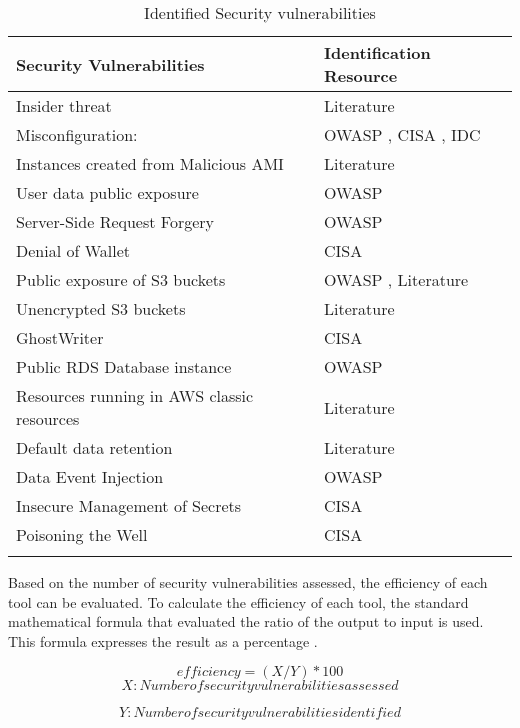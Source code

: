 \begin{longtable}{|p{9cm}|p{4.2cm}|}
    \hline
    \textbf{Security Vulnerabilities} & \textbf{Identification Resource}\\
    \hline
    Insider threat & Literature \cite{93} \\
    \hline
    Misconfiguration: & OWASP \cite{51}, CISA \cite{52}, IDC \cite{53} \\
    \hline
    Instances created from Malicious AMI & Literature \cite{58} \\
    \hline
    User data public exposure & OWASP \cite{51} \\
    \hline
    Server-Side Request Forgery & OWASP \cite{51} \\
    \hline
    Denial of Wallet & CISA \cite{52} \\
    \hline
    Public exposure of S3 buckets & OWASP \cite{51}, Literature
    \cite{94}\\
    \hline
    Unencrypted S3 buckets & Literature \cite{95}\\
    \hline
    GhostWriter & CISA \cite{52} \\
    \hline
    Public RDS Database instance & OWASP \cite{51} \\
    \hline
    Resources running in AWS classic resources &
    Literature \cite{96}\\
    \hline
    Default data retention & Literature \cite{97} \\
    \hline
    Data Event Injection & OWASP \cite{51} \\
    \hline
    Insecure Management of Secrets & CISA \cite{52} \\
    \hline
    Poisoning the Well & CISA \cite{52} \\
    \hline
    \caption{Identified Security vulnerabilities}
    \label{tab:securityvulnerabilitiesandresources}
\end{longtable}

\par Based on the number of security vulnerabilities assessed, the efficiency of each tool can be evaluated.
To calculate the efficiency of each tool, the standard mathematical formula that evaluated the ratio of the output to input is used.
This formula expresses the result as a percentage \cite{98}.

\[ efficiency = (X/Y) * 100\]
\[  X: Number of security vulnerabilities assessed \]

\[  Y: Number of security vulnerabilities identified \]

